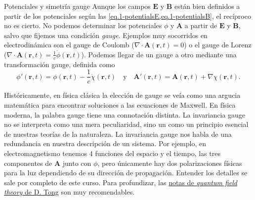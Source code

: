 \begin{observation}
    {Potenciales y simetría gauge}
    \label{obs.1-potenciales}
    Aunque los campos \(\mathbf{E}\) y \(\mathbf{B}\) están bien definidos a partir de los potenciales según las \cref{eq.1-potentialsE,eq.1-potentialsB}, el recíproco no es cierto. No podemos determinar los potenciales \(\phi\) y \(\mathbf{A}\) a partir de \(\mathbf{E}\) y \(\mathbf{B}\), salvo que fijemos una condición \emph{gauge}. Ejemplos muy socorridos en electrodinámica son el gauge de Coulomb (\(\nabla\cdot\mathbf{A}(\mathbf{r}, t) = 0\)) o el gauge de Lorenz (\(\nabla\cdot\mathbf{A}(\mathbf{r}, t)=\frac{1}{c}\dot{\phi}(\mathbf{r}, t)\)).  Podemos llegar de un gauge a otro mediante una transformación gauge, definida como
    \begin{equation}
        \phi'(\mathbf{r}, t) = \phi(\mathbf{r}, t) - \frac{1}{c} \dot{\chi}(\mathbf{r}, t) \quad \text{y} \quad \mathbf{A}'(\mathbf{r}, t) = \mathbf{A}(\mathbf{r}, t) + \nabla\chi(\mathbf{r}, t).
    \end{equation}

    Históricamente, en física clásica la elección de gauge se veía como una argucia matemática para encontrar soluciones a las ecuaciones de Maxwell. En física moderna, la palabra gauge tiene una connotación distinta. La invariancia gauge no se interpreta como una mera peculiaridad, sino un como un principio esencial de nuestras teorías de la naturaleza. La invariancia gauge nos habla de una redundancia en nuestra descripción de un sistema. Por ejemplo, en electromagnetismo tenemos 4 funciones del espacio y el tiempo, las tres componentes de \(\mathbf{A}\) junto con \(\phi\), pero únicamente hay dos polarizaciones físicas para la luz dependiendo de su dirección de propagación. Entender los detalles se sale por completo de este curso. Para profundizar, las \href{https://davidtong.org/teaching/quantum-field-theory/} {notas de \textit{quantum field theory} de D. Tong} son muy recomendables. 
\end{observation}

